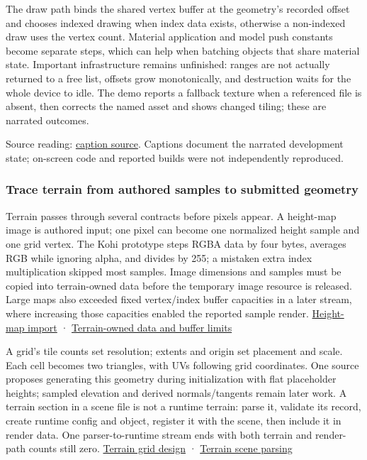 The draw path binds the shared vertex buffer at the geometry's recorded offset and chooses indexed drawing when index data exists, otherwise a non-indexed draw uses the vertex count. Material application and model push constants become separate steps, which can help when batching objects that share material state. Important infrastructure remains unfinished: ranges are not actually returned to a free list, offsets grow monotonically, and destruction waits for the whole device to idle. The demo reports a fallback texture when a referenced file is absent, then corrects the named asset and shows changed tiling; these are narrated outcomes.

Source reading: \href{https://www.youtube.com/watch?v=tHW0T6a0h5E}{caption source}. Captions document the narrated development state; on-screen code and reported builds were not independently reproduced.

\subsubsection{Trace terrain from authored samples to submitted geometry}\label{06-engine-ii-ch031-trace-terrain-from-authored-samples-to-submitted-geometry}

\hypertarget{06-engine-ii-ch031-trace-terrain-from-authored-samples-to-submitted-geometry}{}

Terrain passes through several contracts before pixels appear. A height-map image is authored input; one pixel can become one normalized height sample and one grid vertex. The Kohi prototype steps RGBA data by four bytes, averages RGB while ignoring alpha, and divides by 255; a mistaken extra index multiplication skipped most samples. Image dimensions and samples must be copied into terrain-owned data before the temporary image resource is released. Large maps also exceeded fixed vertex/index buffer capacities in a later stream, where increasing those capacities enabled the reported sample render. \href{https://www.youtube.com/watch?v=hSvbfxOPCZ0}{Height-map import} · \href{https://www.youtube.com/watch?v=vLzvpFaX50A}{Terrain-owned data and buffer limits}

A grid's tile counts set resolution; extents and origin set placement and scale. Each cell becomes two triangles, with UVs following grid coordinates. One source proposes generating this geometry during initialization with flat placeholder heights; sampled elevation and derived normals/tangents remain later work. A terrain section in a scene file is not a runtime terrain: parse it, validate its record, create runtime config and object, register it with the scene, then include it in render data. One parser-to-runtime stream ends with both terrain and render-path counts still zero. \href{https://www.youtube.com/watch?v=unypFSvg7gI}{Terrain grid design} · \href{https://www.youtube.com/watch?v=o3VS8tbwaRI}{Terrain scene parsing}

